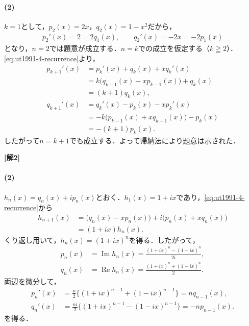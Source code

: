 \documentclass[../main.tex]{subfiles}
\begin{document}
\paragraph{(2)}
$k=1$として，$p_2(x)=2x$，$q_2(x)=1-x^2$だから，
\begin{align*}
  p_2'(x)=2=2q_1(x),\qquad q_2'(x)=-2x=-2p_1(x)
\end{align*}
となり，$n=2$では題意が成立する．$n=k$での成立を仮定する（$k\geqq2$）．\eqref{eq:ut1991-4-recurrence}より，
\begin{align*}
  p_{k+1}'(x)
  &=p_k'(x)+q_k(x)+xq_k'(x)\\
  &=k\bigl(q_{k-1}(x)-xp_{k-1}(x)\bigr)+q_k(x)\\
  &=(k+1)q_k(x),\\
  q_{k+1}'(x)
  &=q_k'(x)-p_k(x)-xp_k'(x)\\
  &=-k\bigl(p_{k-1}(x)+xq_{k-1}(x)\bigr)-p_k(x)\\
  &=-(k+1)p_k(x).
\end{align*}
したがって$n=k+1$でも成立する．よって帰納法により題意は示された．

\bigskip\noindent
{\bf [解2]}

\paragraph{(2)}
$h_n(x)=q_n(x)+ip_n(x)$とおく．$h_1(x)=1+ix$であり，\eqref{eq:ut1991-4-recurrence}から
\begin{align*}
  h_{n+1}(x)
  &=\bigl(q_n(x)-xp_n(x)\bigr)
  +i\bigl(p_n(x)+xq_n(x)\bigr)\\
  &=(1+ix)h_n(x).
\end{align*}
くり返し用いて，$h_n(x)=(1+ix)^n$を得る．したがって，
\begin{align*}
  p_n(x)&=\operatorname{Im}h_n(x)
  =\frac{(1+ix)^n-(1-ix)^n}{2i},\\
  q_n(x)&=\operatorname{Re}h_n(x)
  =\frac{(1+ix)^n+(1-ix)^n}{2}.
\end{align*}
両辺を微分して，
\begin{align*}
  p_n'(x)
  &=\frac{n}{2}\bigl\{(1+ix)^{n-1}+(1-ix)^{n-1}\bigr\}
  =nq_{n-1}(x),\\
  q_n'(x)
  &=\frac{ni}{2}\bigl\{(1+ix)^{n-1}-(1-ix)^{n-1}\bigr\}
  =-np_{n-1}(x).
\end{align*}
を得る．

\newpage
\end{document}
